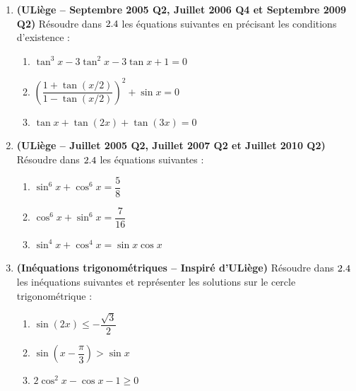 \begin{enumerate}[label=\textbf{Exercice 3.\arabic* --}, align=left, leftmargin=*]
    \item \textbf{(ULiège -- Septembre 2005 Q2, Juillet 2006 Q4 et Septembre 2009 Q2)} Résoudre dans $2.4$ les équations suivantes en précisant les conditions d'existence :
    \begin{enumerate}
        \item $\tan^3 x - 3\tan^2 x - 3\tan x + 1 = 0$
        \item $\left(\dfrac{1 + \tan(x/2)}{1 - \tan(x/2)}\right)^2 + \sin x = 0$
        \item $\tan x + \tan(2x) + \tan(3x) = 0$
    \end{enumerate}

    \item \textbf{(ULiège -- Juillet 2005 Q2, Juillet 2007 Q2 et Juillet 2010 Q2)} Résoudre dans $2.4$ les équations suivantes :
    \begin{enumerate}
        \item $\sin^6 x + \cos^6 x = \dfrac{5}{8}$
        \item $\cos^6 x + \sin^6 x = \dfrac{7}{16}$
        \item $\sin^4 x + \cos^4 x = \sin x \cos x$
    \end{enumerate}

    \item \textbf{(Inéquations trigonométriques -- Inspiré d'ULiège)} Résoudre dans $2.4$ les inéquations suivantes et représenter les solutions sur le cercle trigonométrique :
    \begin{enumerate}
        \item $\sin(2x) \le -\dfrac{\sqrt{3}}{2}$
        \item $\sin\left(x - \dfrac{\pi}{3}\right) > \sin x$
        \item $2\cos^2 x - \cos x - 1 \ge 0$
    \end{enumerate}
\end{enumerate}

